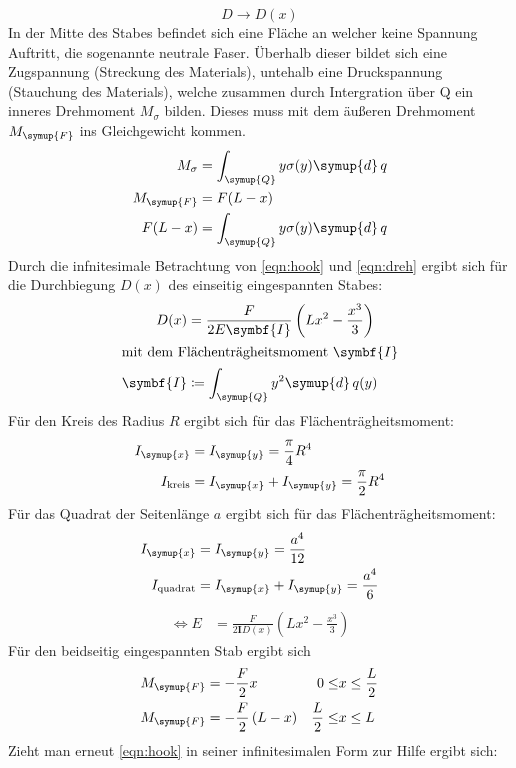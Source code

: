 \begin{equation}
  D \to D(x)
\end{equation}
In der Mitte des Stabes befindet sich eine Fläche an welcher
keine Spannung Auftritt, die sogenannte neutrale Faser. Überhalb dieser
bildet sich eine Zugspannung (Streckung des Materials), untehalb eine Druckspannung
(Stauchung des Materials), welche zusammen durch Intergration über Q ein inneres Drehmoment $M_\sigma$ bilden.
Dieses muss mit dem äußeren Drehmoment $M_\symup{F}$ ins Gleichgewicht kommen.
\begin{align}
  M_\sigma &= \int_\symup{Q} y \sigma(y) \symup{d} \, q\\
  M_\symup{F} &= F(L-x)\\
  F(L-x) &= \int_\symup{Q} y \sigma(y) \symup{d} \, q
  \label{eqn:dreh}
\end{align}
Durch die infnitesimale Betrachtung von \eqref{eqn:hook} und \eqref{eqn:dreh} ergibt
sich für die Durchbiegung $D(x)$ des einseitig eingespannten Stabes:
\begin{align}
  D(x) &= \frac{F}{2E\symbf{I}}\left(Lx^2-\frac{x^3}{3}\right)\\
  \intertext{mit dem Flächenträgheitsmoment $\symbf{I}$}
\symbf{I} &\coloneq \int_\symup{Q} y^2 \symup{d}\, q(y) \\
\end{align}
Für den Kreis des Radius $R$ ergibt sich für das Flächenträgheitsmoment:
\begin{align}
  I_\symup{x}&=I_\symup{y}=\frac{\pi}{4}R^4\\
  I_\text{kreis}&=I_\symup{x}+I_\symup{y}=\frac{\pi}{2}R^4
  \label{eqn:Ikreis}
\end{align}
Für das Quadrat der Seitenlänge $a$ ergibt sich für das Flächenträgheitsmoment:
\begin{align}
  I_\symup{x}&=I_\symup{y}=\frac{a^4}{12}\\
  I_\text{quadrat}&=I_\symup{x}+I_\symup{y}=\frac{a^4}{6}
  \label{eqn:Iquadrat}
\end{align}
\begin{align}
\iff E &= \frac{F}{2\symbf{I}D(x)}\left(Lx^2-\frac{x^3}{3}\right)
\label{eqn:einseitig}
\end{align}
Für den beidseitig eingespannten Stab ergibt sich
\begin{align}
  M_\symup{F} &= -\frac{F}{2}x & 0 \leq &x \leq \frac{L}{2}\\
  M_\symup{F} &= -\frac{F}{2}\left(L-x\right) & \frac{L}{2} \leq &x \leq L\\
\end{align}
Zieht man erneut \eqref{eqn:hook} in seiner infinitesimalen Form zur Hilfe
ergibt sich:

